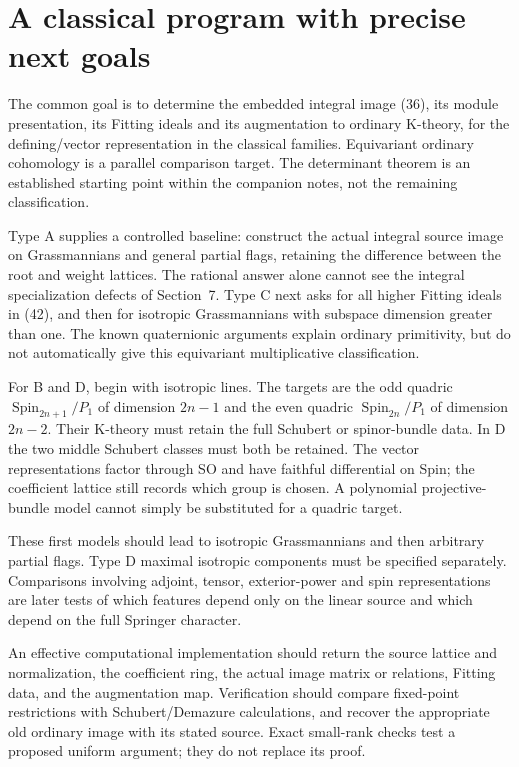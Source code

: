 \documentclass[11pt,letterpaper]{article}
\newcommand{\Spin}{\operatorname{Spin}}\newcommand{\IG}{\operatorname{IG}}
\theoremstyle{definition}\newtheorem{definition}[theorem]{Definition}
\begin{document}
\section{A classical program with precise next goals}
The common goal is to determine the embedded integral image (36),
its module presentation, its Fitting ideals and its augmentation
to ordinary K-theory, for the defining/vector representation in
the classical families. Equivariant ordinary cohomology is a parallel
comparison target. The determinant theorem is an established starting
point within the companion notes, not the remaining classification.

Type A supplies a controlled baseline: construct the actual integral
source image on Grassmannians and general partial flags, retaining
the difference between the root and weight lattices. The rational
answer alone cannot see the integral specialization defects of
Section~7. Type C next asks for all higher Fitting ideals in (42),
and then for isotropic Grassmannians with subspace dimension greater
than one. The known quaternionic arguments explain ordinary
primitivity, but do not automatically give this equivariant
multiplicative classification.

For B and D, begin with isotropic lines. The targets are the odd
quadric \(\Spin_{2n+1}/P_1\) of dimension \(2n-1\) and the even
quadric \(\Spin_{2n}/P_1\) of dimension \(2n-2\).
Their K-theory must retain the full Schubert or spinor-bundle data.
In D the two middle Schubert classes must both be retained.
The vector representations factor through SO and have faithful
differential on Spin; the coefficient lattice still records which
group is chosen. A polynomial projective-bundle model cannot simply
be substituted for a quadric target.

These first models should lead to isotropic Grassmannians and then
arbitrary partial flags. Type D maximal isotropic components must
be specified separately. Comparisons involving adjoint, tensor,
exterior-power and spin representations are later tests of which
features depend only on the linear source and which depend on the
full Springer character.

An effective computational implementation should return the source
lattice and normalization, the coefficient ring, the actual image
matrix or relations, Fitting data, and the augmentation map.
Verification should compare fixed-point restrictions with
Schubert/Demazure calculations, and recover the appropriate old
ordinary image with its stated source. Exact small-rank checks test
a proposed uniform argument; they do not replace its proof.
\end{document}
